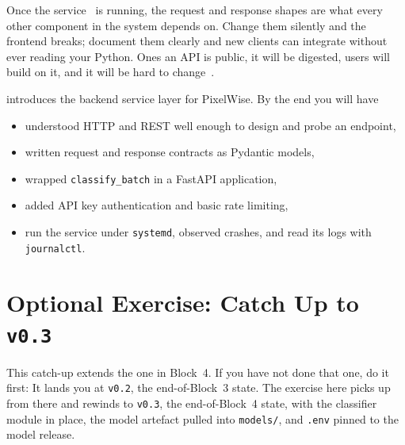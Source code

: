 Once the service~\cite{WintersSoftwareEngGoogle2020} is running, the request and response shapes are what
every other component in the system depends on.
Change them silently and the frontend breaks; document them clearly and
new clients can integrate without ever reading your Python.
Ones an API is public, it will be digested, users will build on it, and it will be hard to change~\cite{BrooksMythicalManMonth1995}.



 introduces the backend service layer for PixelWise.
By the end you will have
\begin{itemize}
    \item understood HTTP and REST well enough to design and probe an endpoint,
    \item written request and response contracts as Pydantic models,
    \item wrapped \texttt{classify\_batch} in a FastAPI application,
    \item added API key authentication and basic rate limiting,
    \item run the service under \texttt{systemd}, observed crashes, and read its logs with \texttt{journalctl}.
\end{itemize}




\newpage
\section{Optional Exercise: Catch Up to \texttt{v0.3}}


This catch-up extends the one in Block~4. If you have not done that one,
do it first: It lands you at \texttt{v0.2}, the end-of-Block~3 state. The
exercise here picks up from there and rewinds to \texttt{v0.3}, the
end-of-Block~4 state, with the classifier module in place, the model
artefact pulled into \texttt{models/}, and \texttt{.env} pinned to the
model release.


